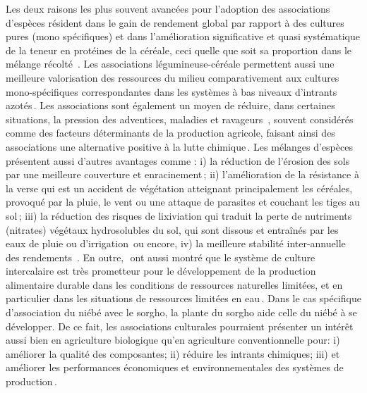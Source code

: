 \documentclass[a4paper,11pt]{article}
\begin{document}
Les deux raisons les plus souvent avancées pour l’adoption des
associations d’espèces résident dans le gain de rendement global par
rapport à des cultures pures (mono spécifiques) et dans l’amélioration
significative et quasi systématique de la teneur en protéines de la
céréale, ceci quelle que soit sa proportion dans le mélange récolté
\,\cite{Jensen_1996}. Les associations légumineuse-céréale permettent
aussi une meilleure valorisation des ressources du milieu
comparativement aux cultures mono-spécifiques correspondantes dans les
systèmes à bas niveaux d’intrants azotés\,\cite{Bedoussac_2010}. Les
associations sont également un moyen de réduire, dans certaines
situations, la pression des adventices, maladies et ravageurs
\,\cite{Altieri_1999}, souvent considérés comme des facteurs
déterminants de la production agricole, faisant ainsi des associations
une alternative positive à la lutte
chimique\,\cite{Hauggaard_2001}. Les mélanges d’espèces présentent
aussi d’autres avantages comme : i) la réduction de l’érosion des sols
par une meilleure couverture et enracinement\,\cite{Zougmore_1998};
ii) l’amélioration de la résistance à la verse qui est un accident de
végétation atteignant principalement les céréales, provoqué par la
pluie, le vent ou une attaque de parasites et couchant les tiges au
sol\,\cite{Anil_1998}; iii) la réduction des risques de lixiviation
qui traduit la perte de nutriments (nitrates) végétaux hydrosolubles
du sol, qui sont dissous et entraînés par les eaux de pluie ou
d’irrigation\,\cite{CorreHellou_2005} ou encore, iv) la meilleure
stabilité inter-annuelle des rendements \,\cite{Lithourgidis_2006}. En
outre,\,\citeauthor{Chu_2004}\,\citeyear{Chu_2004} ont aussi montré
que le système de culture intercalaire est très prometteur pour le
développement de la production alimentaire durable dans les conditions
de ressources naturelles limitées, et en particulier dans les
situations de ressources limitées en eau\,\cite{Tsubo_2005}. Dans le
cas spécifique d’association du niébé avec le sorgho, la plante du
sorgho aide celle du niébé à se développer. De ce fait, les
associations culturales pourraient présenter un intérêt aussi bien en
agriculture biologique qu’en agriculture conventionnelle pour: i)
améliorer la qualité des composantes; ii) réduire les intrants
chimiques; iii) et améliorer les performances économiques et
environnementales des systèmes de
production\,\cite{Koulibi_FideleZONGO}.

\end{document}
